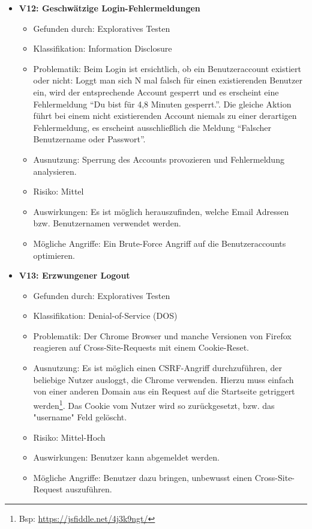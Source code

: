\documentclass[12pt,DIV14,BCOR10mm,a4paper,parskip=half-,headsepline,headinclude,english,ngerman,bibliography=totocnumbered]{scrreprt}
\begin{document}
\begin{itemize}
  \hypertarget{vulnerability12}{}
  \item \textbf{V12: Geschwätzige Login-Fehlermeldungen}
  \begin{itemize}
  \item Gefunden durch: Exploratives Testen
  \item Klassifikation: Information Disclosure
  \item Problematik: Beim Login ist ersichtlich, ob ein Benutzeraccount existiert oder nicht: Loggt man sich N mal falsch für einen existierenden Benutzer ein, wird der entsprechende Account gesperrt und es erscheint eine Fehlermeldung \enquote{Du bist für 4,8 Minuten gesperrt.}. Die gleiche Aktion führt bei einem nicht existierenden Account niemals zu einer derartigen Fehlermeldung, es erscheint ausschließlich die Meldung \enquote{Falscher Benutzername oder Passwort}.
  \item Ausnutzung: Sperrung des Accounts provozieren und Fehlermeldung analysieren.
  \item Risiko: Mittel
  \item Auswirkungen: Es ist möglich herauszufinden, welche Email Adressen bzw. Benutzernamen verwendet werden.
  \item Mögliche Angriffe: Ein Brute-Force Angriff auf die Benutzeraccounts optimieren.
  \end{itemize}

  \hypertarget{vulnerability13}{}
  \item \textbf{V13: Erzwungener Logout}
  \begin{itemize}
  \item Gefunden durch: Exploratives Testen
  \item Klassifikation: Denial-of-Service (DOS)
  \item Problematik: Der Chrome Browser und manche Versionen von Firefox reagieren auf Cross-Site-Requests mit einem Cookie-Reset.
  \item Ausnutzung: Es ist möglich einen CSRF-Angriff durchzuführen, der beliebige Nutzer ausloggt, die Chrome verwenden. Hierzu muss einfach von einer anderen Domain aus ein Request auf die Startseite getriggert werden\footnote{Bsp: \url{https://jsfiddle.net/4j3k9ngt/}}. Das Cookie vom Nutzer wird so zurückgesetzt, bzw. das "username" Feld gelöscht.
  \item Risiko: Mittel-Hoch
  \item Auswirkungen: Benutzer kann abgemeldet werden.
  \item Mögliche Angriffe: Benutzer dazu bringen, unbewusst einen Cross-Site-Request auszuführen.
  \end{itemize}


\end{itemize}
\end{document}
